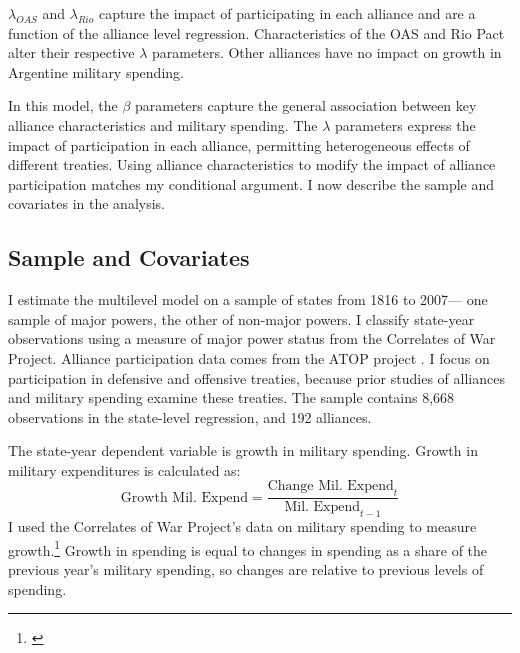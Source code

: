 \documentclass[12pt]{article}
\begin{document}
$\lambda_{OAS}$ and $\lambda_{Rio}$ capture the impact of participating in each alliance and are a function of the alliance level regression. 
Characteristics of the OAS and Rio Pact alter their respective $\lambda$ parameters.
Other alliances have no impact on growth in Argentine military spending. 


In this model, the $\beta$ parameters capture the general association between key alliance characteristics and military spending. 
The $\lambda$ parameters express the impact of participation in each alliance, permitting heterogeneous effects of different treaties. 
Using alliance characteristics to modify the impact of alliance participation matches my conditional argument. 
I now describe the sample and covariates in the analysis.  



\subsection{Sample and Covariates} 

I estimate the multilevel model on a sample of states from 1816 to 2007--- one sample of major powers, the other of non-major powers. 
I classify state-year observations using a measure of major power status from the Correlates of War Project. 
Alliance participation data comes from the ATOP project \citep{Leedsetal2002}.  
I focus on participation in defensive and offensive treaties, because prior studies of alliances and military spending examine these treaties. 
The sample contains 8,668 observations in the state-level regression, and 192 alliances. 


The state-year dependent variable is growth in military spending.
Growth in military expenditures is calculated as:
\begin{equation}
\mbox{Growth Mil. Expend} = \frac{ \mbox{Change Mil. Expend}_t }{ \mbox{Mil. Expend}_{t-1} }
\end{equation} 
I used the Correlates of War Project's data on military spending to measure growth.\footnote{\cite{SingerCINC1988}} 
Growth in spending is equal to changes in spending as a share of the previous year's military spending, so changes are relative to previous levels of spending. 
\end{document}

